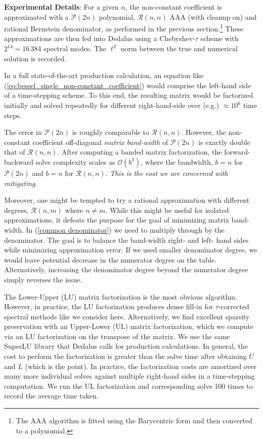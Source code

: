 \documentclass{article}
\begin{document}
{\textbf{Experimental Details}: For a given $n$, the non-constant coefficient is approximated with a $\mathcal{P}(2n)$ polynomial, $\mathcal{R}(n,n)$ AAA (with cleanup on) and rational Bernstein denominator, as performed in the previous section.\footnote{The AAA algorithm is fitted using the Barycentric form and then converted to a polynomial.} These approximations are then fed into Dedalus \cite{dedalus} using a Chebyshev-$\tau$ scheme with $2^{14}=16\,384$ spectral modes. The $\ell^2$ norm between the true and numerical solution is recorded.} 

{In a full state-of-the-art production calculation, an equation like (\ref{eq:bessel_single_non-constant_coefficient}) would comprise the left-hand side of a time-stepping scheme. To this end, the resulting matrix would be factorized initially and solved repeatedly for different right-hand-side over (e.g.) $\approx 10^{6}$ time steps.}

{The error in $\mathcal{P}(2n)$ is roughly comparable to $\mathcal{R}(n,n)$. However, the non-constant coefficient off-diagonal \textit{matrix band-width} of $\mathcal{P}(2n)$ is exactly double that of $\mathcal{R}(n,n)$. After computing a banded matrix factorization, the forward-backward solve complexity scales as $\mathcal{O}(b^{3})$, where the bandwidth, $b = n$ for $\mathcal{P}(2n)$ and $b=n$ for $\mathcal{R}(n,n)$. \textit{This is the cost we are concerned with mitigating.}}

{Moreover, one might be tempted to try a rational approximation with different degrees, $\mathcal{R}(n,m)$ where $n\ne m$. While this might be useful for isolated approximations, it defeats the purpose for the goal of minimizing matrix band-width. In (\ref{common denominator}) we need to multiply through by the denominator. The goal is to balance the band-width right- and left- hand sides while minimizing approximation error. If we used smaller denominator degree, we would leave potential decrease in the numerator degree on the table. Alternatively, increasing the  denominator degree beyond the numerator degree simply reverses the issue.}

{The Lower-Upper (LU) matrix factorization is the most obvious algorithm. However, in practice, the LU factorization produces dense fill-in for $\tau$-corrected spectral methods like we consider here. Alternatively, we find excellent sparsity preservation with an Upper-Lower (UL) matrix factorization, which we compute via an LU factorization on the transpose of the matrix. We use the same SuperLU \cite{SuperLU} library that Dedalus calls for production calculations. In general, the cost to perform the factorization is greater than the solve time after obtaining $U$ and $L$ (which is the point). In practice, the factorization costs are amortized over many more individual solves against multiple right-hand sides in a time-stepping computation.  
We run the UL factorization and corresponding solve 100 times to record the average time taken.}
\end{document}
